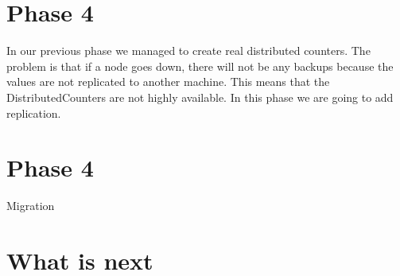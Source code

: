 \section{Phase 4}
In our previous phase we managed to create real distributed counters. The problem is that if a node goes down, there will not be any backups because the values are not replicated to another machine. This means that the DistributedCounters are not highly available. In this phase we are going to add replication.

\section{Phase 4}
Migration

\section{What is next}